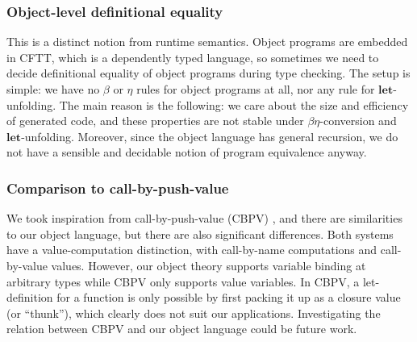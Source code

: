 \documentclass[acmsmall,screen,review,anonymous]{acmart}
\newcommand{\mbf}[1]{{\mathbf{#1}}}
\theoremstyle{remark}
\begin{document}
\subsubsection{Object-level definitional equality} This is a distinct notion
from runtime semantics. Object programs are embedded in CFTT, which is a
dependently typed language, so sometimes we need to decide definitional equality of
object programs during type checking. The setup is simple: we have no $\beta$ or
$\eta$ rules for object programs at all, nor any rule for $\mbf{let}$-unfolding.
The main reason is the following: we care about the size and efficiency of
generated code, and these properties are not stable under $\beta\eta$-conversion
and $\mbf{let}$-unfolding. Moreover, since the object language has general
recursion, we do not have a sensible and decidable notion of program equivalence
anyway.

\subsubsection{Comparison to call-by-push-value}
We took inspiration from call-by-push-value (CBPV) \cite{DBLP:conf/tlca/Levy99},
and there are similarities to our object language, but there are also
significant differences. Both systems have a value-computation distinction, with
call-by-name computations and call-by-value values. However, our object theory
supports variable binding at arbitrary types while CBPV only supports value
variables. In CBPV, a let-definition for a function is only possible by first
packing it up as a closure value (or ``thunk''), which clearly does not suit our
applications.  Investigating the relation between CBPV and our object language
could be future work.

\end{document}
